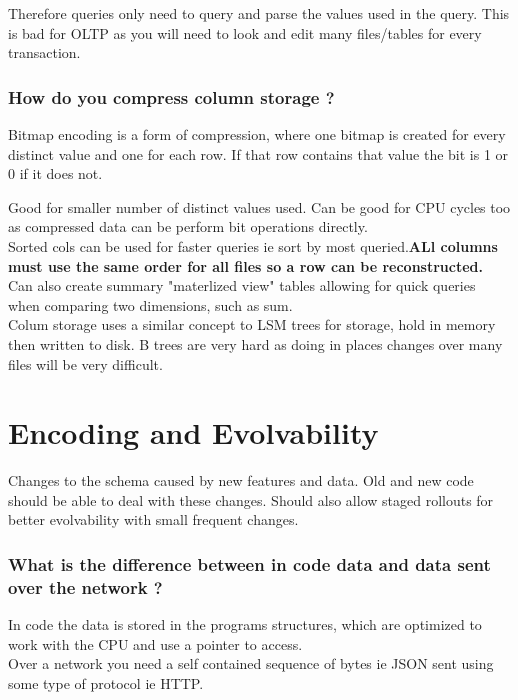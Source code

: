 \documentclass[11pt]{scrartcl} %
\begin{document}
Therefore queries only need to query and parse the values used in the query. This is bad for OLTP
as you will need to look and edit many files/tables for every transaction.

\subsubsection{How do you compress column storage ?}

Bitmap encoding is a form of compression, where one bitmap is created for every distinct value
and one for each row. If that row contains that value the bit is 1 or 0 if it does not.

Good for smaller number of distinct values used. Can be good for CPU cycles too as compressed data
can be perform bit operations directly.\\

Sorted cols can be used for faster queries ie sort by most queried.\textbf{ALl columns must use
the same order for all files so a row can be reconstructed.}\\

Can also create summary "materlized view" tables allowing for quick queries when comparing two
dimensions, such as sum.\\

Colum storage uses a similar concept to LSM trees for storage, hold in memory then written to disk.
B trees are very hard as doing in places changes over many files will be very difficult.

\section{Encoding and Evolvability}

Changes to the schema caused by new features and data. Old and new code should be able to deal with
these changes. Should also allow staged rollouts for better evolvability with small frequent changes.

\subsubsection{What is the difference between in code data and data sent over the network ?}

In code the data is stored in the programs structures, which are optimized to work with the CPU
and use a pointer to access. \\

Over a network you need a self contained sequence of bytes ie JSON sent using some type of protocol
ie HTTP.
\end{document}
